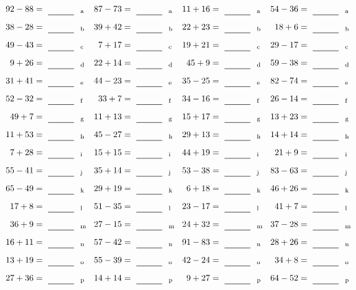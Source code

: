 \documentclass
[
  draft    = true,
  fontsize = 11pt,
  parskip  = half-
]
{scrartcl}
\begin{document}
\clearpage
\begin{align*}
    \pline{92-88}&=\rline{a}
  & \pline{87-73}&=\rline{a}
  & \pline{11+16}&=\rline{a}
  & \pline{54-36}&=\rline{a} \\[1ex]
    \pline{38-28}&=\rline{b}
  & \pline{39+42}&=\rline{b}
  & \pline{22+23}&=\rline{b}
  & \pline{18+6}&=\rline{b} \\[1ex]
    \pline{49-43}&=\rline{c}
  & \pline{7+17}&=\rline{c}
  & \pline{19+21}&=\rline{c}
  & \pline{29-17}&=\rline{c} \\[1ex]
    \pline{9+26}&=\rline{d}
  & \pline{22+14}&=\rline{d}
  & \pline{45+9}&=\rline{d}
  & \pline{59-38}&=\rline{d} \\[1ex]
    \pline{31+41}&=\rline{e}
  & \pline{44-23}&=\rline{e}
  & \pline{35-25}&=\rline{e}
  & \pline{82-74}&=\rline{e} \\[1ex]
    \pline{52-32}&=\rline{f}
  & \pline{33+7}&=\rline{f}
  & \pline{34-16}&=\rline{f}
  & \pline{26-14}&=\rline{f} \\[1ex]
    \pline{49+7}&=\rline{g}
  & \pline{11+13}&=\rline{g}
  & \pline{15+17}&=\rline{g}
  & \pline{13+23}&=\rline{g} \\[1ex]
    \pline{11+53}&=\rline{h}
  & \pline{45-27}&=\rline{h}
  & \pline{29+13}&=\rline{h}
  & \pline{14+14}&=\rline{h} \\[1ex]
    \pline{7+28}&=\rline{i}
  & \pline{15+15}&=\rline{i}
  & \pline{44+19}&=\rline{i}
  & \pline{21+9}&=\rline{i} \\[1ex]
    \pline{55-41}&=\rline{j}
  & \pline{35+14}&=\rline{j}
  & \pline{53-38}&=\rline{j}
  & \pline{83-63}&=\rline{j} \\[1ex]
    \pline{65-49}&=\rline{k}
  & \pline{29+19}&=\rline{k}
  & \pline{6+18}&=\rline{k}
  & \pline{46+26}&=\rline{k} \\[1ex]
    \pline{17+8}&=\rline{l}
  & \pline{51-35}&=\rline{l}
  & \pline{23-17}&=\rline{l}
  & \pline{41+7}&=\rline{l} \\[1ex]
    \pline{36+9}&=\rline{m}
  & \pline{27-15}&=\rline{m}
  & \pline{24+32}&=\rline{m}
  & \pline{37-28}&=\rline{m} \\[1ex]
    \pline{16+11}&=\rline{n}
  & \pline{57-42}&=\rline{n}
  & \pline{91-83}&=\rline{n}
  & \pline{28+26}&=\rline{n} \\[1ex]
    \pline{13+19}&=\rline{o}
  & \pline{55-39}&=\rline{o}
  & \pline{42-24}&=\rline{o}
  & \pline{34+8}&=\rline{o} \\[1ex]
    \pline{27+36}&=\rline{p}
  & \pline{14+14}&=\rline{p}
  & \pline{9+27}&=\rline{p}
  & \pline{64-52}&=\rline{p}
\end{align*}
\end{document}
